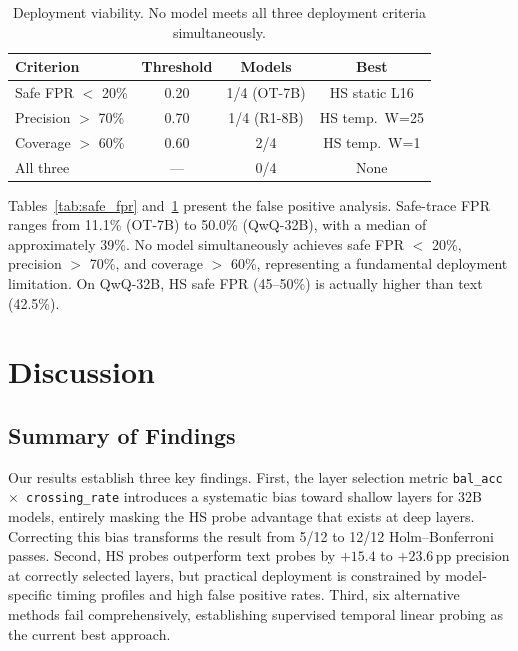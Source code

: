 \documentclass[11pt]{article}
\newcommand{\pp}{\,\text{pp}}
\begin{document}
\begin{table}[t]
\centering
\small
\begin{tabular}{@{}lccc@{}}
\toprule
\textbf{Criterion} & \textbf{Threshold} & \textbf{Models} & \textbf{Best} \\
\midrule
Safe FPR $<$ 20\% & 0.20 & 1/4 (OT-7B) & HS static L16 \\
Precision $>$ 70\% & 0.70 & 1/4 (R1-8B) & HS temp.\ W=25 \\
Coverage $>$ 60\% & 0.60 & 2/4 & HS temp.\ W=1 \\
All three & --- & 0/4 & None \\
\bottomrule
\end{tabular}
\caption{Deployment viability. No model meets all three deployment criteria simultaneously.}
\label{tab:deployment}
\end{table}

Tables~\ref{tab:safe_fpr} and~\ref{tab:deployment} present the false positive analysis.
Safe-trace FPR ranges from 11.1\% (OT-7B) to 50.0\% (QwQ-32B), with a median of approximately 39\%.
No model simultaneously achieves safe FPR $<$ 20\%, precision $>$ 70\%, and coverage $>$ 60\%, representing a fundamental deployment limitation.
On QwQ-32B, HS safe FPR (45--50\%) is actually higher than text (42.5\%).

\section{Discussion}
\label{sec:discussion}

\subsection{Summary of Findings}

Our results establish three key findings.
First, the layer selection metric \texttt{bal\_acc $\times$ crossing\_rate} introduces a systematic bias toward shallow layers for 32B models, entirely masking the HS probe advantage that exists at deep layers.
Correcting this bias transforms the result from 5/12 to 12/12 Holm--Bonferroni passes.
Second, HS probes outperform text probes by $+15.4$ to $+23.6\pp$ precision at correctly selected layers, but practical deployment is constrained by model-specific timing profiles and high false positive rates.
Third, six alternative methods fail comprehensively, establishing supervised temporal linear probing as the current best approach.
\end{document}

